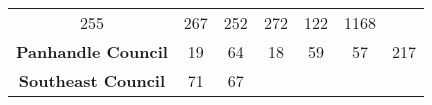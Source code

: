 \documentclass[]{article}
\begin{document}
\begin{longtable}[]{@{}ccccccc@{}}
\begin{minipage}[t]{0.13\columnwidth}
255\strut
\end{minipage} & \begin{minipage}[t]{0.14\columnwidth}\centering\strut
267\strut
\end{minipage} & \begin{minipage}[t]{0.14\columnwidth}\centering\strut
252\strut
\end{minipage} & \begin{minipage}[t]{0.05\columnwidth}\centering\strut
272\strut
\end{minipage} & \begin{minipage}[t]{0.05\columnwidth}\centering\strut
122\strut
\end{minipage} & \begin{minipage}[t]{0.05\columnwidth}\centering\strut
1168\strut
\end{minipage}\tabularnewline
\begin{minipage}[t]{0.26\columnwidth}\centering\strut
\textbf{Panhandle Council}\strut
\end{minipage} & \begin{minipage}[t]{0.13\columnwidth}\centering\strut
19\strut
\end{minipage} & \begin{minipage}[t]{0.14\columnwidth}\centering\strut
64\strut
\end{minipage} & \begin{minipage}[t]{0.14\columnwidth}\centering\strut
18\strut
\end{minipage} & \begin{minipage}[t]{0.05\columnwidth}\centering\strut
59\strut
\end{minipage} & \begin{minipage}[t]{0.05\columnwidth}\centering\strut
57\strut
\end{minipage} & \begin{minipage}[t]{0.05\columnwidth}\centering\strut
217\strut
\end{minipage}\tabularnewline
\begin{minipage}[t]{0.26\columnwidth}\centering\strut
\textbf{Southeast Council}\strut
\end{minipage} & \begin{minipage}[t]{0.13\columnwidth}\centering\strut
71\strut
\end{minipage} & \begin{minipage}[t]{0.14\columnwidth}\centering\strut
67\strut
\end{minipage} & \begin{minipage}[t]{0.14\columnwidth}\centering\strut

\end{minipage}
\end{longtable}
\end{document}
